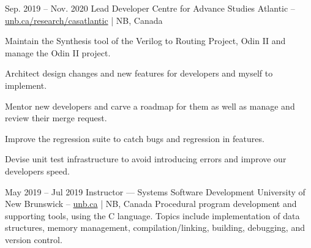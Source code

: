 \entrys
{Sep. 2019 -- Nov. 2020}
{Lead Developer}
{Centre for Advance Studies Atlantic -- \href{https://www.unb.ca/research/casatlantic/}{unb.ca/research/casatlantic} | NB, Canada}{
	Maintain the Synthesis tool of the Verilog to Routing Project, Odin II and manage the Odin II project.
	\begin{tightemize}
		\item Architect design changes and new features for developers and myself to implement.
		\item Mentor new developers and carve a roadmap for them as well as manage and review their merge request.
		\item Improve the regression suite to catch bugs and regression in features.
        \item Devise unit test infrastructure to avoid introducing errors and improve our developers speed.
	\end{tightemize}
}

\entrys
{May 2019 -- Jul 2019}
{Instructor --- Systems Software Development}
{University of New Brunswick -- \href{https://www.unb.ca}{unb.ca} | NB, Canada}{
    Procedural program development and supporting tools, using the C language.
    Topics include implementation of data structures, memory management, compilation/linking, building, debugging, and version control.
}


\ifdefined{}
\fi


